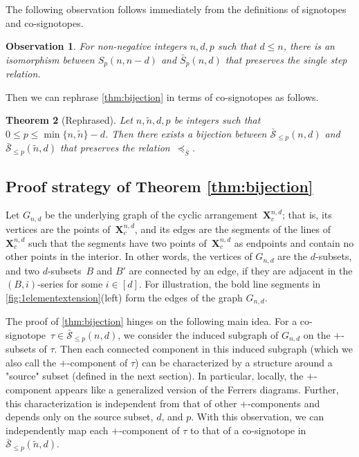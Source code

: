 \documentclass[a4paper,11pt]{amsart}
\newtheorem{theorem}{Theorem}
\newtheorem{observation}[theorem]{Observation}
\newcommand{\calS}{\mathcal{S}}
\newcommand{\tn}{\tilde{n}}
\begin{document}
The following observation follows immediately from the definitions of signotopes and co-signotopes.

\begin{observation}
    For non-negative integers $n, d, p$ such that $d \leq n$, there is an isomorphism between $S_p(n,n-d)$ and $\bar{S}_p(n,d)$ that preserves the single step relation.
\end{observation}

Then we can rephrase \cref{thm:bijection} in terms of co-signotopes as follows.

\begingroup
\def\thetheorem{\ref{thm:bijection}}
\begin{theorem}[Rephrased]
    Let $n, \tilde{n}, d, p$ be integers such that $0\leq p \leq \min\{n,\tn\}-d$.
    Then there exists a bijection between $\bar{\calS}_{\leq p}(n,d)$ and $\bar{\calS}_{\leq p}(\tn,d)$ that preserves the relation~$\preceq_{\bar{S}}$.
\end{theorem}
\addtocounter{theorem}{-1}
\endgroup

\subsection{Proof strategy of Theorem \ref{thm:bijection}}
\label{subsec:proof_outline}
Let $G_{n,d}$ be the underlying graph of the cyclic arrangement~$\mathbf{X}^{n,d}_c$; that is, its vertices are the points of~$\mathbf{X}^{n,d}_c$, and its edges are the segments of the lines of~$\mathbf{X}^{n,d}_c$ such that the segments have two points of~$\mathbf{X}^{n,d}_c$ as endpoints and contain no other points in the interior.
In other words, the vertices of $G_{n,d}$ are the $d$-subsets, and two $d$-subsets~$B$ and $B'$ are connected by an edge, if they are adjacent in the $(B,i)$-series for some $i \in [d]$.
For illustration, the bold line segments in \cref{fig:1elementextension}(left) form the edges of the graph $G_{n,d}$.

The proof of \cref{thm:bijection} hinges on the following main idea.
For a co-signotope~$\tau \in \bar{\calS}_{\leq p}(n,d)$, we consider the induced subgraph of $G_{n,d}$ on the $+$-subsets of $\tau$.
Then each connected component in this induced subgraph (which we also call the $+$-component of $\tau$) can be characterized by a structure around a "source" subset (defined in the next section).
In particular, locally, the $+$-component appears like a generalized version of the Ferrers diagrams.
Further, this characterization is independent from that of other $+$-components and depends only on the source subset, $d$, and $p$.
With this observation, we can independently map each $+$-component of $\tau$ to that of a co-signotope in $\bar{\calS}_{\leq p}(\tn,d)$.
\end{document}
